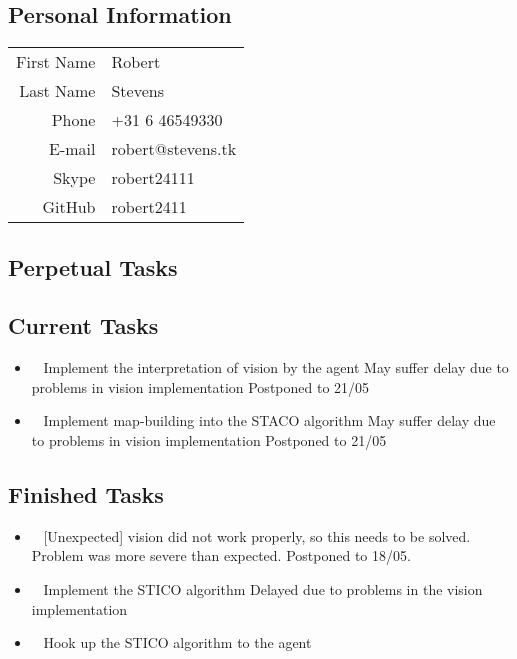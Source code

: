 \subsection{Personal Information}
\begin{table}[h!]
	\begin{tabular}{rl}
	First Name 	& Robert\\
	Last Name	& Stevens\\
	Phone		& +31 6 46549330\\
	E-mail		& robert@stevens.tk\\
	Skype		& robert24111\\
	GitHub		& robert2411
\end{tabular}
\end{table}

\subsection{Perpetual Tasks}

\subsection{Current Tasks}
\begin{itemize}
	\item~
	Implement the interpretation of vision by the agent
		\subitem May suffer delay due to problems in vision implementation
		\subitem Postponed to 21/05
	\item~
	Implement map-building into the STACO algorithm
		\subitem May suffer delay due to problems in vision implementation
		\subitem Postponed to 21/05
	
\end{itemize}

\subsection{Finished Tasks}
\begin{itemize}
	\item~
	[Unexpected] vision did not work properly, so this needs to be solved.
		\subitem Problem was more severe than expected. Postponed to 18/05.
	\item~
	Implement the STICO algorithm
		\subitem Delayed due to problems in the vision implementation
	\item~
	Hook up the STICO algorithm to the agent
\end{itemize}
